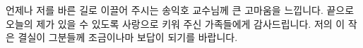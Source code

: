 \documentclass[master,english,final]{kaist-ucs}
\begin{document}
\tableofcontents

\listoftables

\listoffigures
















\acknowledgment[4]
언제나 저를 바른 길로 이끌어 주시는 송익호 교수님께 큰 고마움을 느낍니다.
끝으로 오늘의 제가 있을 수 있도록 사랑으로 키워 주신 가족들에게 감사드립니다.
저의 이 작은 결실이 그분들께 조금이나마 보답이 되기를 바랍니다.

\curriculumvitae[4]

\begin{personaldata}
    \address    {...}
\end{personaldata}
\end{document}
